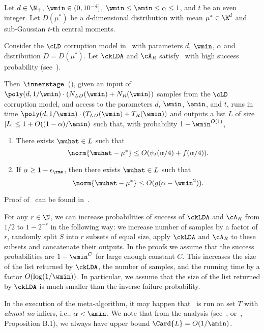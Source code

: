 \begin{theorem}
\label{thm:inner_stage_guarantees}
Let $d \in \N_+$, $\wmin \in (0, 10^{-4}]$, $\wmin \leq \amin \leq \alpha \leq 1$, and $t$ be an even integer.
Let $D(\mu^*)$ be a $d$-dimensional distribution with mean $\mu^* \in \R^d$ and sub-Gaussian $t$-th central moments.

Consider the \(\cLD\) corruption model in~ with parameters $d$, $\wmin$, $\alpha$ and distribution $D = D(\mu^*)$.
Let \(\ckLDA\) and \(\cA_R\) satisfy~ with high success probability (see~).

Then \(\innerstage\)~(), given an input of ${\poly(d, 1/\wmin) \cdot (N_{LD}(\wmin)+N_R(\wmin))}$ samples from the \(\cLD\) corruption model, and access to the parameters $d$, $\wmin$, $\amin$, and $t$, runs in time ${\poly(d, 1/\wmin) \cdot (T_{LD}(\wmin) + T_R(\wmin))}$ 
and outputs a list $L$ of size ${|L| \leq 1 + O((1-\alpha)/\amin)}$ such that, with probability $1-\wmin^{O(1)}$,
\begin{enumerate}
    \item There exists \(\muhat \in L\) such that 
    \[\norm{\muhat-\mu^{\ast}} \leq O(\psi_t(\alpha/4) + f(\alpha/4)).\]
    \item If \(\alpha \geq 1-\epsilon_{\rme}\), then there exists \(\muhat \in L\) such that
    \[\norm{\muhat-\mu^{\ast}} \leq O(g(\alpha - \wmin^2)).\]
\end{enumerate}
\end{theorem}
Proof of~ can be found in~.
\begin{remark}
\label{rem:succ_prob}
For any \(r \in \N\), we can increase probabilities of success of \(\ckLDA\) and \(\cA_R\) from \(1/2\) to \(1 - 2^{-r}\) in the following way: we increase number of samples by a factor of \(r\), randomly split $S$ into $r$ subsets of equal size, apply $\ckLDA$ and $\cA_R$ to these subsets and concatenate their outputs. In the proofs we assume that the success probabilities are $1-\wmin^C$ for large enough constant $C$. This increases the size of the list returned by $\ckLDA$, the number of samples, and the running time by a factor $O(\log(1/\wmin))$. In particular, we assume that the size of the list returned by $\ckLDA$ is much smaller than the inverse 
failure probability.
\end{remark}
\begin{remark}
\label{rem:alpha_smaller_amin}
    In the execution of the meta-algorithm, it may happen that~ is run on set \(T\) with \emph{almost no} inliers, i.e., \(\alpha < \amin\). We note that from the analysis (see~, or~\cite{diakonikolas2018list}, Proposition B.1), we always have upper bound \(\Card{L} = O(1 / \amin)\).
\end{remark}

